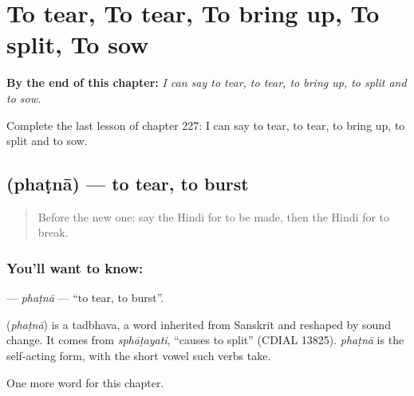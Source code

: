 
\chapter{To tear, To tear, To bring up, To split, To sow}
\label{ch:hi-to-tear-to-tear-to-bring-up-to-split-to-sow}

\begin{chapteropening}
\textbf{By the end of this chapter:} \emph{I can say to tear, to tear, to bring up, to split and to sow.}

Complete the last lesson of chapter 227: I can say to tear, to tear, to bring up, to split and to sow.
\end{chapteropening}

\section[\texorpdfstring{\hi{फटना} (phaṭnā)}{फटना (phaṭnā)}]{ (phaṭnā) — to tear, to burst}

\label{lesson:HI-C227-phatna}



\begin{quote}
Before the new one: say the Hindi for to be made, then the Hindi for to break.
\end{quote}

\subsection*{You'll want to know: }
\textbf{} — \emph{phaṭnā} — \textquotedblleft{}to tear, to burst\textquotedblright{}.

\begin{cousinweb}
\textbf{} (\emph{phaṭnā}) is a tadbhava, a word inherited from Sanskrit and reshaped by sound change. It comes from \emph{sphāṭayati}, \textquotedblleft{}causes to split\textquotedblright{} (CDIAL 13825). \emph{phaṭnā} is the self-acting form, with the short vowel such verbs take.
\end{cousinweb}

\begin{grammarlens}[title={What you've built}]
One more word for this chapter.
\end{grammarlens}

